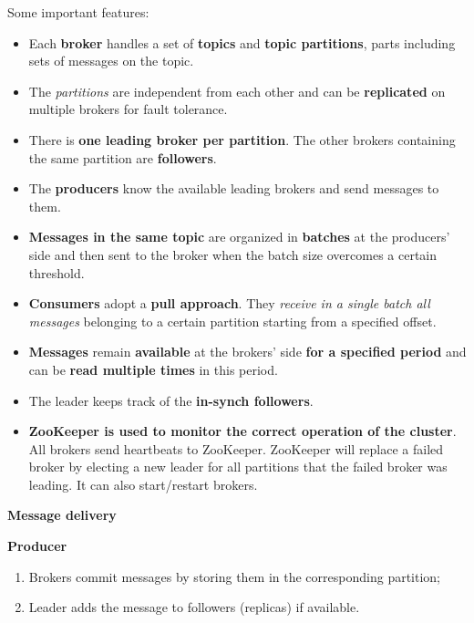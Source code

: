 \noindent
Some important features:
\begin{itemize}
    \item Each \textbf{broker} handles a set of \textbf{topics} and \textbf{topic partitions}, parts including sets of messages on the topic.

    \item The \emph{partitions} are independent from each other and can be \textbf{replicated} on multiple brokers for fault tolerance.

    \item There is \textbf{one leading broker per partition}. The other brokers containing the same partition are \textbf{followers}.
    
    \item The \textbf{producers} know the available leading brokers and send messages to them.
    
    \item \textbf{Messages in the same topic} are organized in \textbf{batches} at the producers' side and then sent to the broker when the batch size overcomes a certain threshold.

    \item \textbf{Consumers} adopt a \textbf{pull approach}. They \emph{receive in a single batch all messages} belonging to a certain partition starting from a specified offset.

    \item \textbf{Messages} remain \textbf{available} at the brokers' side \textbf{for a specified period} and can be \textbf{read multiple times} in this period.
    
    \item The leader keeps track of the \textbf{in-synch followers}.
    
    \item \textbf{ZooKeeper is used to monitor the correct operation of the cluster}. All brokers send heartbeats to ZooKeeper. ZooKeeper will replace a failed broker by electing a new leader for all partitions that the failed broker was leading. It can also start/restart brokers.
\end{itemize}

\begin{center}
    \large
    \textcolor{Red2}{\textbf{Message delivery}}
\end{center}

\begin{flushleft}
    \textcolor{Red2}{\textbf{Producer}}
\end{flushleft}
\begin{enumerate}
    \item Brokers commit messages by storing them in the corresponding partition;
    
    \item Leader adds the message to followers (replicas) if available.
\end{enumerate}

